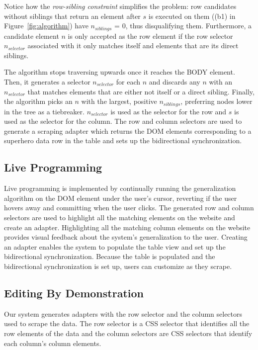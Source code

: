 \documentclass[sigconf,10pt]{acmart}
\begin{document}
Notice how the \emph{row-sibling constraint} simplifies the problem: row
candidates without siblings that return an element after \(s\) is
executed on them ((b1) in Figure~\ref{fig:algorithm}) have
\(n_{siblings}\) = 0, thus disqualifying them. Furthermore, a candidate
element \(n\) is only accepted as the row element if the row selector
\(n_{selector}\) associated with it only matches itself and elements
that are its direct siblings.

The algorithm stops traversing upwards once it reaches the BODY element.
Then, it generates a selector \(n_{selector}\) for each \(n\) and
discards any \(n\) with an \(n_{selector}\) that matches elements that
are either not itself or a direct sibling. Finally, the algorithm picks
an \(n\) with the largest, positive \(n_{siblings}\), preferring nodes
lower in the tree as a tiebreaker. \(n_{selector}\) is used as the
selector for the row and \(s\) is used as the selector for the column.
The row and column selectors are used to generate a scraping adapter
which returns the DOM elements corresponding to a superhero data row in
the table and sets up the bidirectional synchronization.

\hypertarget{live-programming}{%
\subsection{Live Programming}\label{live-programming}}

Live programming is implemented by continually running the
generalization algorithm on the DOM element under the user's cursor,
reverting if the user hovers away and committing when the user clicks.
The generated row and column selectors are used to highlight all the
matching elements on the website and create an adapter. Highlighting all
the matching column elements on the website provides visual feedback
about the system's generalization to the user. Creating an adapter
enables the system to populate the table view and set up the
bidirectional synchronization. Because the table is populated and the
bidirectional synchronization is set up, users can customize as they
scrape.

\hypertarget{editing-by-demonstration}{%
\subsection{Editing By Demonstration}\label{editing-by-demonstration}}

Our system generates adapters with the row selector and the column
selectors used to scrape the data. The row selector is a CSS selector
that identifies all the row elements of the data and the column
selectors are CSS selectors that identify each column's column elements.
\end{document}
